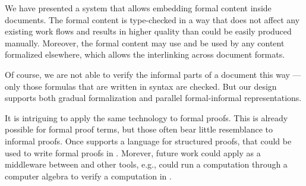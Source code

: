 We have presented a system that allows embedding formal \mmt content inside \latex documents.
The formal content is type-checked in a way that does not affect any existing \latex work flows and results in higher quality \latex than could be easily  produced manually.
Moreover, the formal content may use and be used by any \mmt content formalized elsewhere, which allows the interlinking across document formats.

Of course, we are not able to verify the informal parts of a document this way --- only those formulas that are written in \mmt syntax are checked.
But our design supports both gradual formalization and parallel formal-informal representations.

It is intriguing to apply the same technology to formal proofs.
This is already possible for formal proof terms, but those often bear little resemblance to informal proofs.
Once \mmt supports a language for structured proofs, that could be used to write formal proofs in \mmttex.
Morever, future work could apply \mmt as a middleware between \latex and other tools, e.g., \mmt could run a computation through a computer algebra to verify a computation in \latex.
